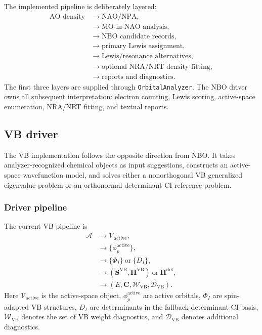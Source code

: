 \documentclass[11pt]{article}
\newcommand{\vb}{\mathrm{VB}}
\begin{document}
The implemented pipeline is deliberately layered:
\begin{equation}
\begin{aligned}
	\text{AO density}
	&\rightarrow \text{NAO/NPA}, \\
	&\rightarrow \text{MO-in-NAO analysis}, \\
	&\rightarrow \text{NBO candidate records}, \\
	&\rightarrow \text{primary Lewis assignment}, \\
	&\rightarrow \text{Lewis/resonance alternatives}, \\
	&\rightarrow \text{optional NRA/NRT density fitting}, \\
	&\rightarrow \text{reports and diagnostics}.
\end{aligned}
\end{equation}
The first three layers are supplied through \texttt{OrbitalAnalyzer}.  The NBO driver owns all subsequent interpretation: electron counting, Lewis scoring, active-space enumeration, NRA/NRT fitting, and textual reports.

\subsection{VB driver}

The VB implementation follows the opposite direction from NBO.  It takes analyzer-recognized chemical objects as input suggestions, constructs an active-space wavefunction model, and solves either a nonorthogonal VB generalized eigenvalue problem or an orthonormal determinant-CI reference problem.

\subsubsection*{Driver pipeline}

The current VB pipeline is
\begin{equation}
\begin{aligned}
	\mathcal{A}
	&\rightarrow \mathcal{V}_{\mathrm{active}}, \\
	&\rightarrow \{\phi_p^{\mathrm{active}}\}, \\
	&\rightarrow \{\Phi_I\}\ \text{or}\ \{D_I\}, \\
	&\rightarrow (\mathbf{S}^{\vb},\mathbf{H}^{\vb})\ \text{or}\ \mathbf{H}^{\mathrm{det}}, \\
	&\rightarrow \left(E,\mathbf{C},\mathcal{W}_{\vb},\mathcal{D}_{\vb}\right).
\end{aligned}
\end{equation}
Here $\mathcal{V}_{\mathrm{active}}$ is the active-space object, $\phi_p^{\mathrm{active}}$ are active orbitals, $\Phi_I$ are spin-adapted VB structures, $D_I$ are determinants in the fallback determinant-CI basis, $\mathcal{W}_{\vb}$ denotes the set of VB weight diagnostics, and $\mathcal{D}_{\vb}$ denotes additional diagnostics.
\end{document}
